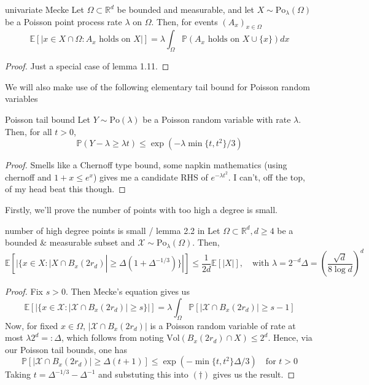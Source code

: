 \documentclass{article}
\begin{document}
\begin{lemma}[]{univariate Mecke}
    Let $\Omega \subset \mathbb{R}^d$ be bounded and measurable, and let $X \sim \text{Po}_\lambda(\Omega)$ be a
    Poisson point process rate $\lambda$ on $\Omega$. Then, for events $(A_x)_{x \in \Omega}$ 
    \[\mathbb{E}[|x \in X \cap \Omega :  A_x \text{ holds on } X|] = \lambda\int_\Omega \mathbb{P}(A_x \text{ holds on } X \cup \{x\})dx\]
\end{lemma}

\begin{proof}
    Just a special case of lemma 1.11.
\end{proof}

We will also make use of the following elementary tail bound for Poisson random variables

\begin{lemma}[]{Poisson tail bound}
    Let $Y \sim \text{Po}(\lambda)$ be a Poisson random variable with rate $\lambda$. Then, for all $t > 0$,
    \[\mathbb{P}(Y - \lambda \geq \lambda t) \leq \exp(-\lambda\min\{t, t^2\}/3)\]
\end{lemma}

\begin{proof}
    Smells like a Chernoff type bound, some napkin mathematics (using chernoff and $1+x \leq e^x$) gives me a candidate 
    RHS of $e^{-\lambda t^2}$. I can't, off the top, of my head beat this though.
\end{proof}

Firstly, we'll prove the number of points with too high a degree is small.

\begin{lemma}[]{number of high degree points is small / lemma 2.2 in \cite{campos2023}}
    Let $\Omega \subset \mathbb{R}^d, d \geq 4$ be a bounded $\&$ measurable subset and 
    $\mathcal{X} \sim \text{Po}_{\lambda}(\Omega)$. Then, 
    \[\mathbb{E}[|\{x \in X : |X \cap B_x(2r_d)| \geq \Delta(1+\Delta^{-1/3})\}|] \leq \frac{1}{2d}\mathbb{E}[|X|], 
    \quad \text{with } \lambda = 2^{-d}\Delta = \left(\frac{\sqrt{d}}{8 \log d}\right)^d\] 
\end{lemma}

\begin{proof}
    Fix $s > 0$. Then Mecke's equation gives us 
    \[\mathbb{E}[|\{x \in \mathcal{X} : |\mathcal{X} \cap B_x(2r_d)| \geq s\}|] 
    = \lambda \int_{\Omega} \mathbb{P}[|\mathcal{X} \cap B_x(2r_d)| \geq s-1] \tag{$\dagger$}\]
    Now, for fixed $x \in \Omega$, $|\mathcal{X} \cap B_x(2r_d)|$ is a Poisson random variable of rate at most 
    $\lambda 2^d =: \Delta$, which follows from noting $\text{Vol}(B_x(2r_d) \cap X) \leq 2^d$. Hence, via our 
    Poisson tail bounds, one has 
    \[\mathbb{P}[|\mathcal{X} \cap B_x(2r_d)| \geq \Delta(t+1)] 
    \leq \exp\left(-\min\{t, t^2\}\Delta/3\right) \quad \text{for } t > 0\] 
    Taking $t = \Delta^{-1/3} - \Delta^{-1}$ and substuting this into $(\dagger)$ gives us the result.
\end{proof}
\end{document}
